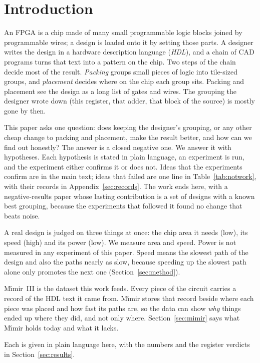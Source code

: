 \section{Introduction}
\label{sec:intro}

An FPGA is a chip made of many small programmable logic blocks joined by programmable wires; a design is loaded onto it by setting those parts. A designer writes the design in a hardware description language (\emph{HDL}), and a chain of CAD programs turns that text into a pattern on the chip. Two steps of the chain decide most of the result. \emph{Packing} groups small pieces of logic into tile-sized groups, and \emph{placement} decides where on the chip each group sits. Packing and placement see the design as a long list of gates and wires. The grouping the designer wrote down (this register, that adder, that block of the source) is mostly gone by then.

This paper asks one question: does keeping the designer's grouping, or any other cheap change to packing and placement, make the result better, and how can we find out honestly? The answer is a closed negative one. We answer it with hypotheses. Each hypothesis is stated in plain language, an experiment is run, and the experiment either confirms it or does not. Ideas that the experiments confirm are in the main text; ideas that failed are one line in Table~\ref{tab:notwork}, with their records in Appendix~\ref{sec:records}. The work ends here, with a negative-results paper whose lasting contribution is a set of designs with a known best grouping, because the experiments that followed it found no change that beats noise.

 A real design is judged on three things at once: the chip area it needs (low), its speed (high) and its power (low). We measure area and speed. Power is not measured in any experiment of this paper. Speed means the slowest path of the design and also the paths nearly as slow, because speeding up the slowest path alone only promotes the next one (Section~\ref{sec:method}).

 M\'{\i}mir~III is the dataset this work feeds. Every piece of the circuit carries a record of the HDL text it came from. M\'{\i}mir stores that record beside where each piece was placed and how fast its paths are, so the data can show \emph{why} things ended up where they did, and not only where. Section~\ref{sec:mimir} says what M\'{\i}mir holds today and what it lacks.

 Each is given in plain language here, with the numbers and the register verdicts in Section~\ref{sec:results}.

